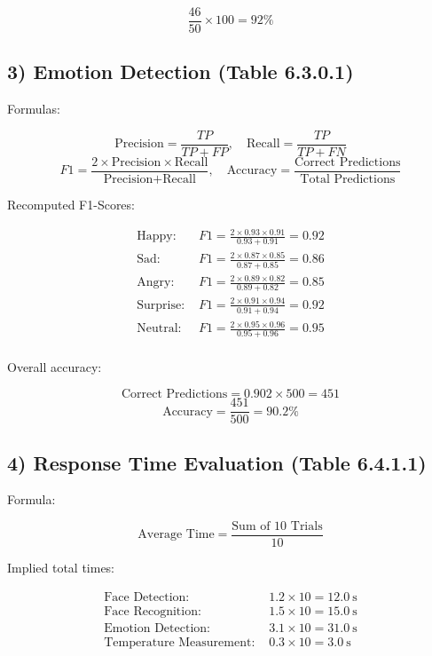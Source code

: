 \[
\frac{46}{50} \times 100 = 92\%
\]

\subsection*{3) Emotion Detection (Table 6.3.0.1)}

Formulas:

\[
\text{Precision} = \frac{TP}{TP + FP}, \quad
\text{Recall} = \frac{TP}{TP + FN}
\]
\[
F1 = \frac{2 \times \text{Precision} \times \text{Recall}}{\text{Precision} + \text{Recall}}, \quad
\text{Accuracy} = \frac{\text{Correct Predictions}}{\text{Total Predictions}}
\]

Recomputed F1-Scores:

\[
\begin{aligned}
\text{Happy: } & F1 = \frac{2 \times 0.93 \times 0.91}{0.93 + 0.91} = 0.92 \\
\text{Sad: } & F1 = \frac{2 \times 0.87 \times 0.85}{0.87 + 0.85} = 0.86 \\
\text{Angry: } & F1 = \frac{2 \times 0.89 \times 0.82}{0.89 + 0.82} = 0.85 \\
\text{Surprise: } & F1 = \frac{2 \times 0.91 \times 0.94}{0.91 + 0.94} = 0.92 \\
\text{Neutral: } & F1 = \frac{2 \times 0.95 \times 0.96}{0.95 + 0.96} = 0.95 \\
\end{aligned}
\]

Overall accuracy:

\[
\text{Correct Predictions} = 0.902 \times 500 = 451
\]
\[
\text{Accuracy} = \frac{451}{500} = 90.2\%
\]

\subsection*{4) Response Time Evaluation (Table 6.4.1.1)}

Formula:

\[
\text{Average Time} = \frac{\text{Sum of 10 Trials}}{10}
\]

Implied total times:

\[
\begin{aligned}
\text{Face Detection: } & 1.2 \times 10 = 12.0 \ \text{s} \\
\text{Face Recognition: } & 1.5 \times 10 = 15.0 \ \text{s} \\
\text{Emotion Detection: } & 3.1 \times 10 = 31.0 \ \text{s} \\
\text{Temperature Measurement: } & 0.3 \times 10 = 3.0 \ \text{s} \\
\end{aligned}
\]
